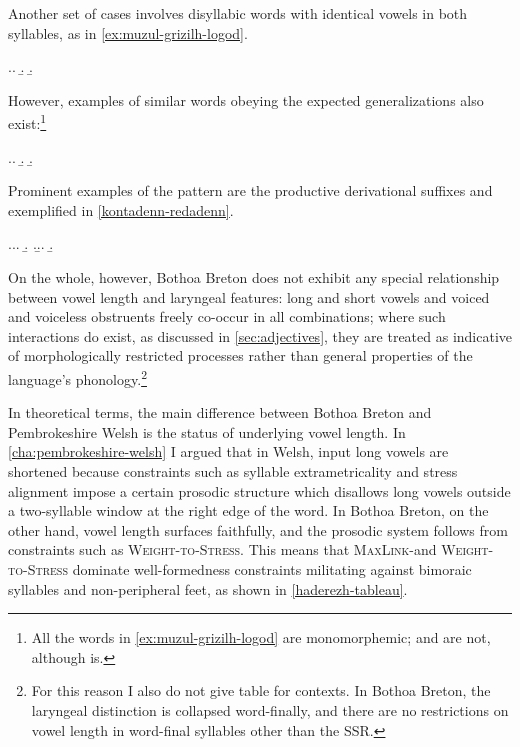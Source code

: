 Another set of cases involves disyllabic words with identical vowels in both syllables, as in \ref{ex:muzul-grizilh-logod}.

\ex.\label{ex:muzul-grizilh-logod}\a.
\b.
\b.

However, examples of similar words obeying the expected generalizations also exist:\footnote{All the words in \cref{ex:muzul-grizilh-logod} are monomorphemic; \ipa{[ˈziːbi]} and \ipa{[ˈdʒɥiːzi]} are not, although \ipa{[ˈiːliz]} is.}

\ex.\a.
\b.
\b.

Prominent examples of the pattern are the productive derivational suffixes  and  exemplified in \ref{kontadenn-redadenn}.

\ex.\label{kontadenn-redadenn}\a.\a.
\b.
\z.\b.\a.
\b.

On the whole, however, Bothoa Breton does not exhibit any special relationship between vowel length and laryngeal features: long and short vowels and voiced and voiceless obstruents freely co-occur in all combinations; where such interactions do exist, as discussed in \cref{sec:adjectives}, they are treated as indicative of morphologically restricted processes rather than general properties of the language's phonology.\footnote{For this reason I also do not give  table for  contexts. In Bothoa Breton, the laryngeal distinction is collapsed word-finally, and there are no restrictions on vowel length in word-final syllables other than the SSR.}

In theoretical terms, the main difference between Bothoa Breton and Pembrokeshire Welsh is the status of underlying vowel length. In \cref{cha:pembrokeshire-welsh} I argued that in Welsh, input long vowels are shortened because constraints such as syllable extrametricality and stress alignment impose a certain prosodic structure which disallows long vowels outside a two\hyp syllable window at the right edge of the word. In Bothoa Breton, on the other hand, vowel length surfaces faithfully, and the prosodic system follows from constraints such as \textsc{Weight\hyp to\hyp Stress}. This means that \textsc{MaxLink}-\mo and \textsc{Weight-to-Stress} dominate well\hyp formedness constraints militating against bimoraic syllables and non\hyp peripheral feet, as shown in \ref{haderezh-tableau}.


